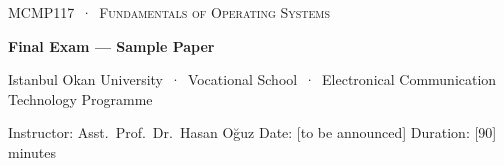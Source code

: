 \documentclass[11pt,a4paper]{article}
\begin{document}
\setlength{\parskip}{0.35em}
\newcommand{\pts}[1]{\hfill\textcolor{mintdeep}{\textbf{[#1~pt]}}}
\newcommand{\ans}[1]{\par\smallskip\noindent\begin{tikzpicture}\draw[muted!60,rounded corners=2pt] (0,0) rectangle (\linewidth,#1);\end{tikzpicture}\par\medskip}
\newcommand{\ganttgrid}[2]{\par\noindent\begin{tikzpicture}[x=0.7cm]
\node[anchor=east,font=\small\bfseries] at (-0.2,0.31) {#2};
\draw[muted!70] (0,0) rectangle (#1,0.62);
\foreach \t in {0,...,#1} {\draw[muted!70] (\t,0) -- (\t,-0.1) node[below,font=\scriptsize,text=muted,inner sep=1pt] {\t};}
\end{tikzpicture}\par\smallskip}
\newcommand{\frametable}[1]{\begin{tabular}{@{}l|*{12}{>{\centering\arraybackslash}p{0.6cm}|}@{}}
\multicolumn{13}{@{}l}{\textbf{#1}}\\ \hline
ref & 5 & 4 & 1 & 5 & 0 & 5 & 4 & 0 & 2 & 1 & 0 & 1 \\ \hline
fr.\ 0 &&&&&&&&&&&& \\ \hline
fr.\ 1 &&&&&&&&&&&& \\ \hline
fr.\ 2 &&&&&&&&&&&& \\ \hline
fault &&&&&&&&&&&& \\ \hline
\end{tabular}}

\thispagestyle{empty}
\begin{tcolorbox}[enhanced,colback=dark,colframe=dark,arc=0pt,boxrule=0pt,
  left=18pt,right=18pt,top=14pt,bottom=14pt,coltext=white]
{\small\color{mint}\textsc{MCMP117 \,·\, Fundamentals of Operating Systems}}\par\smallskip
{\headfont\fontsize{22}{26}\selectfont\bfseries Final Exam --- Sample Paper}\par\smallskip
{\small Istanbul Okan University \,·\, Vocational School \,·\, Electronical Communication Technology Programme}\par
{\small Instructor: Asst.\ Prof.\ Dr.\ Hasan Oğuz \quad Date: [to be announced] \quad Duration: [90] minutes}
\end{tcolorbox}
\end{document}
